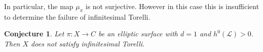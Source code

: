 \documentclass{amsart}
\newcommand{\cL}{\mathcal{L}}
\newtheorem{conjecture}[theorem]{Conjecture}
\theoremstyle{definition}
\theoremstyle{remark}
\begin{document}
In particular,  the map $\mu_\pi$ is not surjective. However in this case this is insufficient to determine the failure of infinitesimal Torelli. 



\begin{conjecture}Let $\pi:X\to C$ be an elliptic surface with $d=1$ and $h^0(\cL)>0$. Then $X$ does not satisfy infinitesimal Torelli.
\end{conjecture}



\end{document}

